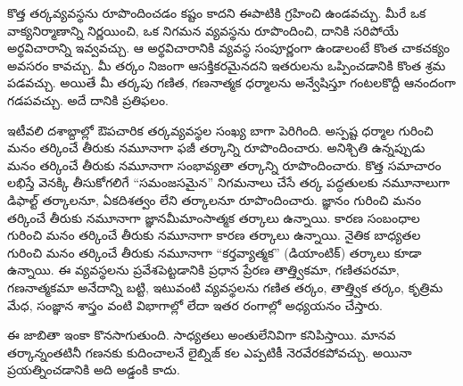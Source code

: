\documentclass[../../../include/open-logic-section]{subfiles}
\begin{document}


కొత్త తర్కవ్యవస్థను రూపొందించడం కష్టం కాదని ఈపాటికి గ్రహించి ఉండవచ్చు. మీరే ఒక వాక్యనిర్మాణాన్ని నిర్ణయించి, ఒక నిగమన
వ్యవస్థను రూపొందించి, దానికి సరిపోయే అర్థవిచారాన్ని ఇవ్వవచ్చు.
ఆ అర్థవిచారానికి  వ్యవస్థ సంపూర్ణంగా ఉండాలంటే కొంత
చాకచక్యం అవసరం కావచ్చు. మీ తర్కం నిజంగా ఆసక్తికరమైనదని ఇతరులను
ఒప్పించడానికి కొంత శ్రమ పడవచ్చు. అయితే మీ తర్కపు
గణిత, గణనాత్మక ధర్మాలను అన్వేషిస్తూ గంటలకొద్దీ ఆనందంగా గడపవచ్చు.
అదే దానికి ప్రతిఫలం.

ఇటీవలి దశాబ్దాల్లో ఔపచారిక తర్కవ్యవస్థల సంఖ్య బాగా పెరిగింది.
అస్పష్ట ధర్మాల గురించి మనం తర్కించే తీరుకు నమూనాగా ఫజీ తర్కాన్ని
రూపొందించారు. అనిశ్చితి ఉన్నప్పుడు మనం తర్కించే తీరుకు నమూనాగా
సంభావ్యతా తర్కాన్ని రూపొందించారు. కొత్త సమాచారం లభిస్తే
వెనక్కి తీసుకోగలిగే ``సమంజసమైన'' నిగమనాలు చేసే
తర్క పద్ధతులకు నమూనాలుగా డిఫాల్ట్ తర్కాలనూ, ఏకదిశత్వం లేని తర్కాలనూ
రూపొందించారు. జ్ఞానం గురించి మనం తర్కించే తీరుకు నమూనాగా
జ్ఞానమీమాంసాత్మక తర్కాలు ఉన్నాయి. కారణ సంబంధాల గురించి మనం తర్కించే తీరుకు
నమూనాగా కారణ తర్కాలు ఉన్నాయి. నైతిక బాధ్యతల గురించి మనం తర్కించే తీరుకు
నమూనాగా ``కర్తవ్యాత్మక'' (డియాంటిక్) తర్కాలు కూడా ఉన్నాయి. ఈ
వ్యవస్థలను ప్రవేశపెట్టడానికి ప్రధాన ప్రేరణ తాత్త్వికమా, గణితపరమా,
గణనాత్మకమా అనేదాన్ని బట్టి, ఇటువంటి వ్యవస్థలను గణిత తర్కం, తాత్త్విక
తర్కం, కృత్రిమ మేధ, సంజ్ఞాన శాస్త్రం వంటి విభాగాల్లో లేదా ఇతర రంగాల్లో అధ్యయనం చేస్తారు.

ఈ జాబితా ఇంకా కొనసాగుతుంది. సాధ్యతలు అంతులేనివిగా కనిపిస్తాయి.
మానవ తర్కాన్నంతటినీ గణనకు కుదించాలనే లైబ్నిజ్ కల ఎప్పటికీ నెరవేరకపోవచ్చు. అయినా
ప్రయత్నించడానికి అది అడ్డంకి కాదు.
\end{document}
